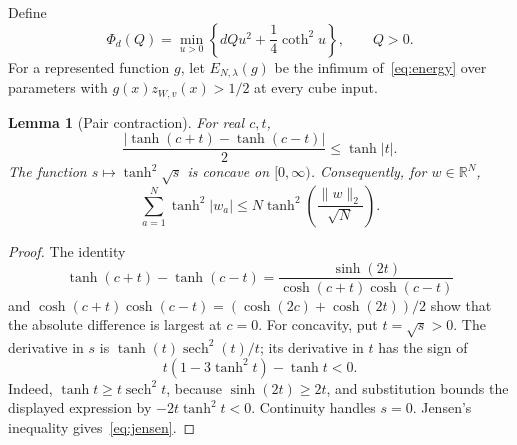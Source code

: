 \documentclass[11pt]{article}
\newtheorem{lemma}[theorem]{Lemma}
\newcommand{\R}{\mathbb R}
\begin{document}
Define
\begin{equation}\label{eq:phi}
 \Phi_d(Q)=\min_{u>0}\left\{dQu^2+\frac14\coth^2u\right\},
 \qquad Q>0.
\end{equation}
For a represented function $g$, let $E_{N,\lambda}(g)$ be the infimum
of~\eqref{eq:energy} over parameters with
$g(x)z_{W,v}(x)>1/2$ at every cube input.

\begin{lemma}[Pair contraction]\label{lem:pair}
For real $c,t$,
\[
 \frac{|\tanh(c+t)-\tanh(c-t)|}{2}\le\tanh|t|.
\]
The function $s\mapsto\tanh^2\sqrt{s}$ is concave on $[0,\infty)$.
Consequently, for $w\in\R^N$,
\begin{equation}\label{eq:jensen}
 \sum_{a=1}^N\tanh^2|w_a|
 \le N\tanh^2\!\left(\frac{\|w\|_2}{\sqrt N}\right).
\end{equation}
\end{lemma}
\begin{proof}
The identity
\[
 \tanh(c+t)-\tanh(c-t)
 =\frac{\sinh(2t)}{\cosh(c+t)\cosh(c-t)}
\]
and
$\cosh(c+t)\cosh(c-t)=(\cosh(2c)+\cosh(2t))/2$
show that the absolute difference is largest at $c=0$.
For concavity, put $t=\sqrt{s}>0$. The derivative in $s$ is
$\tanh(t)\operatorname{sech}^2(t)/t$; its derivative in $t$ has the sign of
\[
 t(1-3\tanh^2t)-\tanh t<0.
\]
Indeed, $\tanh t\ge t\operatorname{sech}^2t$, because
$\sinh(2t)\ge2t$, and substitution bounds the displayed expression
by $-2t\tanh^2t<0$. Continuity handles $s=0$.
Jensen's inequality gives~\eqref{eq:jensen}.
\end{proof}
\end{document}
